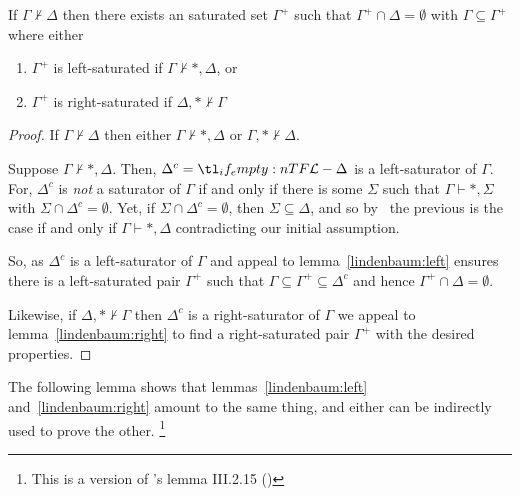 \documentclass[10pt]{article}
\begin{document}
\begin{corollary}[Saturation]
  If \(\Gamma \nvdash \Delta\) then there exists an saturated set \(\Gamma^{+}\) such that \(\Gamma^{+} \cap \Delta = \emptyset\) with \(\Gamma \subseteq \Gamma^{+}\) where either
  \begin{enumerate}
  \item \(\Gamma^{+}\) is left-saturated if \(\Gamma \nvdash \ast, \Delta\), or
  \item \(\Gamma^{+}\) is right-saturated if \(\Delta,\ast \nvdash \Gamma\)
  \end{enumerate}
  \begin{proof}
    If \(\Gamma \nvdash \Delta\) then either \(\Gamma \nvdash \ast, \Delta\) or \(\Gamma, \ast \nvdash \Delta\).

    Suppose \(\Gamma \nvdash \ast, \Delta\).
    Then, \(\Delta^{c} = \olang{} - \Delta\) is a left-saturator of \(\Gamma\).
    For, \(\Delta^{c}\) is \emph{not} a saturator of \(\Gamma\) if and only if there is some \(\Sigma\) such that \(\Gamma \vdash \ast, \Sigma\) with \(\Sigma \cap \Delta^{c} = \emptyset\).
    Yet, if \(\Sigma \cap \Delta^{c} = \emptyset\), then \(\Sigma \subseteq \Delta\), and so by \ the previous is the case if and only if \(\Gamma \vdash \ast, \Delta\) contradicting our initial assumption.

    So, as \(\Delta^{c}\) is a left-saturator of \(\Gamma\) and appeal to lemma~\ref{lindenbaum:left} ensures there is a left-saturated pair \(\Gamma^{+}\) such that \(\Gamma \subseteq \Gamma^{+} \subseteq \Delta^{c}\) and hence \(\Gamma^{+} \cap \Delta = \emptyset\).

    Likewise, if \(\Delta, \ast \nvdash \Gamma\) then \(\Delta^{c}\) is a right-saturator of \(\Gamma\) we appeal to lemma~\ref{lindenbaum:right} to find a right-saturated pair \(\Gamma^{+}\) with the desired properties.
  \end{proof}
\end{corollary}

The following lemma shows that lemmas~\ref{lindenbaum:left} and~\ref{lindenbaum:right} amount to the same thing, and either can be indirectly used to prove the other.\nolinebreak
\footnote{This is a version of \citeauthor{Blamey:1980aa}'s lemma III.2.15 (\citeyear[122]{Blamey:1980aa})}
\end{document}
